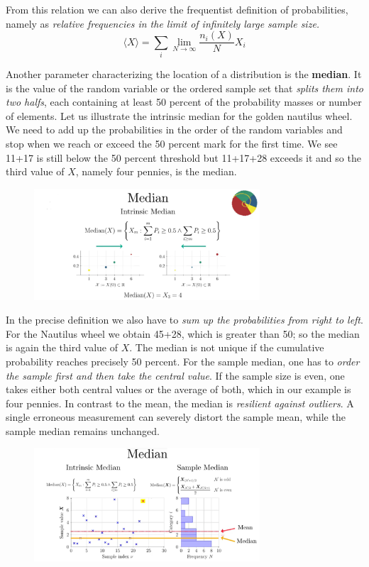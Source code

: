 \documentclass[12pt, a4paper]{scrartcl}
\begin{document}
From this relation we can also derive the frequentist definition of probabilities, namely as \textit{relative frequencies in the limit of infinitely large sample size.}\\
\begin{equation*}\boxed{\langle X \rangle = \sum_i \lim_{N\rightarrow \infty} \frac{n_i(X)}{N}X_i}\end{equation*}


Another parameter characterizing the location of a distribution is the \textbf{median}. It is the value of the random variable or the ordered sample set that \textit{splits them into two halfs}, each containing at least 50 percent of the probability masses or number of elements.
Let us illustrate the intrinsic median for the golden nautilus wheel. We need to add up the probabilities in the order of the random variables and stop when we reach or exceed the 50 percent mark for the first time. We see 11+17 is still below the 50 percent threshold but 11+17+28 exceeds it and so the third value of $X$, namely four pennies, is the median.
\begin{figure}[H]
	\centering
	\includegraphics[width=0.75\textwidth]{2_6.png}
\end{figure}
In the precise definition we also have to \textit{sum up the probabilities from right to left}. For the Nautilus wheel we obtain 45+28, which is greater than 50; so the median is again the third value of $X$. The median is not unique if the cumulative probability reaches precisely 50 percent.
For the sample median, one has to \textit{order the sample first and then take the central value}. If the sample size is even, one takes either both central values or the average of both, which in our example is four pennies.
In contrast to the mean, the median is \textit{resilient against outliers}. A single erroneous measurement can severely distort the sample mean, while the sample median remains unchanged.\\
\begin{figure}[H]
	\centering
	\includegraphics[width=0.75\textwidth]{2_7.png}
\end{figure}
\end{document}
